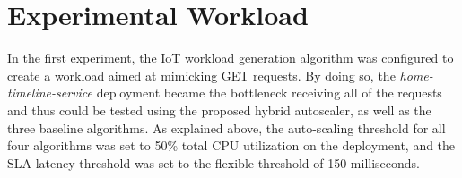 \section{Experimental Workload}
\label{sec:ch6-exp-workload}

In the first experiment, the IoT workload generation algorithm was configured to create a workload aimed at mimicking GET requests. By doing so, the \textit{home-timeline-service} deployment became the bottleneck receiving all of the requests and thus could be tested using the proposed hybrid autoscaler, as well as the three baseline algorithms. As explained above, the auto-scaling threshold for all four algorithms was set to 50\% total CPU utilization on the deployment, and the SLA latency threshold was set to the flexible threshold of 150 milliseconds.\par

